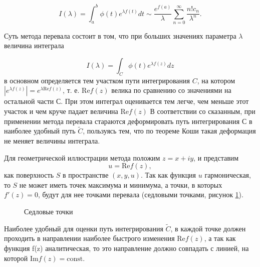 \documentclass[14pt, a4paper]{article}
\numberwithin{figure}{section}
\numberwithin{equation}{section}
\renewcommand{\Re}{\mathrm{Re}}
\renewcommand{\Im}{\mathrm{Im}}
\newcommand{\const}{\mathrm{const}}
\begin{document}
\begin{equation}\label{eq:eq10}
I(\lambda) = \int_{a}^{b}\phi(t)e^{\lambda f(t)}dt \sim \frac{e^{f(a)}}{\lambda}\sum_{n=0}^{\infty}\frac{n! c_n}{\lambda^n}.
\end{equation}

Суть метода перевала состоит в том, что при больших значениях параметра $\lambda$ величина интеграла

$$
I(\lambda) = \int_{C}^{}\phi(t)e^{\lambda f(z)}dz
$$
в основном определяется тем участком пути интегрирования $C$, на котором $|e^{\lambda f(z)}|=e^{\lambda \Re f(z)}$, т. е. $\Re f(z)$ велика по сравнению со значениями на остальной части $С$. При этом интеграл оценивается тем легче, чем меньше этот участок и чем круче падает величина $\Re f(z)$ В соответствии со сказанным, при применении метода перевала стараются деформировать путь интегрирования С в наиболее удобный путь $\widetilde{C}$, пользуясь тем, что по теореме Коши такая деформация не меняет величины интеграла.\cite{Urmat}

Для геометрической иллюстрации метода положим $z = x + iy$, и представим
$$
u = \Re f(z),
$$
как поверхность $S$ в пространстве $(x, y, u)$. Так как функция $u$ гармоническая, то $S$ не может иметь точек максимума и минимума, а точки, в которых $f'(z) = 0$, будут для нее точками перевала (седловыми точками, рисунок \ref{ris:image2}).

\begin{figure}[h]
	\caption{Седловые точки}
	\label{ris:image2}
	\end{figure}

Наиболее удобный для оценки путь интегрирования $\widetilde{C}$, в каждой точке должен проходить в направлении наиболее быстрого изменения $\Re f(z)$, а так как функция f(z) аналитическая, то это направление должно совпадать с линией, на которой $\Im f(z) = \const$. 
\end{document}
